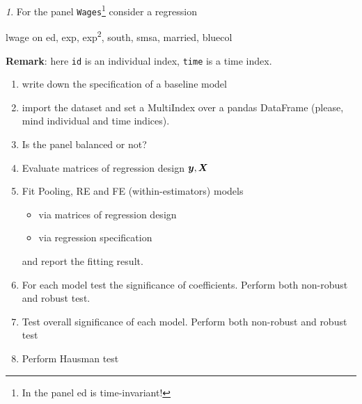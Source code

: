 \documentclass[12pt]{article}
\theoremstyle{remark}
\newtheorem{exercise}{}[section]
\begin{document}
\begin{exercise}
For the panel \texttt{Wages}\footnote{In the panel ed is time-invariant!} 
consider a regression
\begin{center}
	lwage on ed, exp, exp\textsuperscript2, south, smsa, married, bluecol 
\end{center}
\textbf{Remark}: here \texttt{id} is an individual index, 
\texttt{time} is a time index.
\begin{enumerate}
	\item write down the specification of a baseline model
	\item import the dataset and set a MultiIndex over a pandas DataFrame 
	(please, mind  individual and time indices).
	\item Is the panel balanced or not?
	\item Evaluate matrices of regression design \({\bm y}, {\bm X}\)
	\item Fit Pooling, RE and FE (within-estimators) models
	\begin{itemize}
		\item via matrices of regression design
		\item via regression specification
	\end{itemize}
	and report the fitting result.
	\item For each model test the significance of coefficients. Perform both
	non-robust and robust test.
	\item Test overall significance of each model. Perform both
	non-robust and robust test
	\item Perform Hausman test
\end{enumerate}
\end{exercise}
\end{document}
